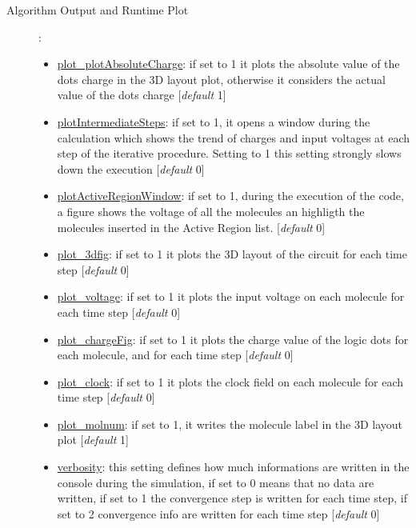 \documentclass[a4paper,10pt]{article}
\begin{document}
\begin{description}
\item[Algorithm Output and Runtime Plot]:
	\begin{itemize}
	\item \underline{plot\_plotAbsoluteCharge}: if set to 1 it plots the absolute value of the dots charge in the 3D layout plot, otherwise it considers the actual value of the dots charge [\textit{default} 1] 
	\item \underline{plotIntermediateSteps}: if set to 1, it opens a window during the calculation which shows the trend of charges and input voltages at each step of the iterative procedure. Setting to 1 this setting strongly slows down the execution [\textit{default} 0] 
	\item \underline{plotActiveRegionWindow}: if set to 1, during the execution of the code, a figure shows the voltage of all the molecules an highligth the molecules inserted in the Active Region list.  [\textit{default} 0] 
	\item \underline{plot\_3dfig}: if set to 1 it plots the 3D layout of the circuit for each time step [\textit{default} 0] 
	\item \underline{plot\_voltage}: if set to 1 it plots the input voltage on each molecule for each time step [\textit{default} 0] 
	\item \underline{plot\_chargeFig}: if set to 1 it plots the charge value of the logic dots for each molecule, and for each time step [\textit{default} 0] 
	\item \underline{plot\_clock}: if set to 1 it plots the clock field on each molecule for each time step [\textit{default} 0]
	\item \underline{plot\_molnum}: if set to 1, it writes the molecule label in the 3D layout plot [\textit{default} 1] 
	\item \underline{verbosity}: this setting defines how much informations are written in the console during the simulation, if set to 0 means that no data are written, if set to 1 the convergence step is written for each time step, if set to 2 convergence info are written for each time step [\textit{default} 0] 

\end{itemize}
\end{description}
\end{document}

